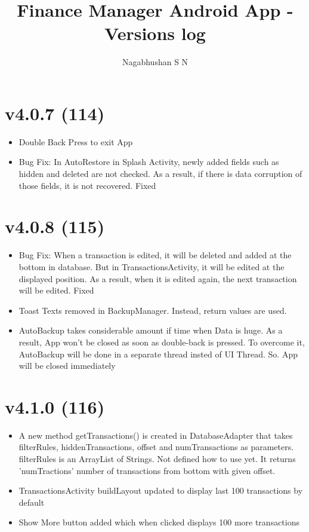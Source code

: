 \documentclass{article}
\title{Finance Manager Android App - Versions log}
\author{Nagabhushan S N}
\begin{document}
\maketitle
\tableofcontents
\newpage

\section{v4.0.7 (114)}
\begin{itemize}
\item Double Back Press to exit App
\item Bug Fix: In AutoRestore in Splash Activity, newly added fields such as hidden and deleted are not checked. As a result, if there is data corruption of those fields, it is not recovered. Fixed
\end{itemize}

\section{v4.0.8 (115)}
\begin{itemize}
\item Bug Fix: When a transaction is edited, it will be deleted and added at the bottom in database. But in TransactionsActivity, it will be edited at the displayed position. As a result, when it is edited again, the next transaction will be edited. Fixed
\item Toast Texts removed in BackupManager. Instead, return values are used.
\item AutoBackup takes considerable amount if time when Data is huge. As a result, App won't be closed as soon as double-back is pressed. To overcome it, AutoBackup will be done in a separate thread insted of UI Thread. So. App will be closed immediately
\end{itemize}

\section{v4.1.0 (116)}
\begin{itemize}
\item A new method getTransactions() is created in DatabaseAdapter that takes filterRules, hiddenTransactions, offset and numTransactions as parameters. filterRules is an ArrayList of Strings. Not defined how to use yet. It returns 'numTractions' number of transactions from bottom with given offset.
\item TransactionsActivity buildLayout updated to display last 100 transactions by default
\item Show More button added which when clicked displays 100 more transactions
\end{itemize}
\end{document}
